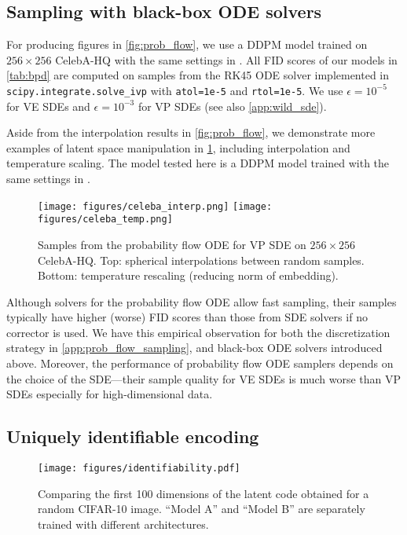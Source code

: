 \documentclass{article} \usepackage{iclr2021_conference,times}
\begin{document}
\subsection{Sampling with black-box ODE solvers}\label{app:flow}
For producing figures in \cref{fig:prob_flow}, we use a DDPM model trained on $256\times 256$ CelebA-HQ with the same settings in \citet{ho2020denoising}. All FID scores of our models in \cref{tab:bpd} are computed on samples from the RK45 ODE solver implemented in  \verb|scipy.integrate.solve_ivp| with \verb|atol=1e-5| and \verb|rtol=1e-5|. We use $\epsilon = 10^{-5}$ for VE SDEs and $\epsilon = 10^{-3}$ for VP SDEs (see also \cref{app:wild_sde}). 

Aside from the interpolation results in \cref{fig:prob_flow}, we demonstrate more examples of latent space manipulation in \cref{fig:celeba256}, including interpolation and temperature scaling. The model tested here is a DDPM model trained with the same settings in \citet{ho2020denoising}.
\begin{figure}
    \centering
    \texttt{[image: figures/celeba\_interp.png]}
    \texttt{[image: figures/celeba\_temp.png]}
    \caption{Samples from the probability flow ODE for VP SDE on $256\times 256$ CelebA-HQ. Top: spherical interpolations between random samples. Bottom: temperature rescaling (reducing norm of embedding).}
    \label{fig:celeba256}
\end{figure}

Although solvers for the probability flow ODE allow fast sampling, their samples typically have higher (worse) FID scores than those from SDE solvers if no corrector is used. We have this empirical observation for both the discretization strategy in \cref{app:prob_flow_sampling}, and black-box ODE solvers introduced above. Moreover, the performance of probability flow ODE samplers depends on the choice of the SDE---their sample quality for VE SDEs is much worse than VP SDEs especially for high-dimensional data.

\subsection{Uniquely identifiable encoding}\label{app:identifiability}

\begin{figure}
    \centering
    \texttt{[image: figures/identifiability.pdf]}
    \caption{Comparing the first 100 dimensions of the latent code obtained for a random CIFAR-10 image. ``Model A'' and ``Model B'' are separately trained with different architectures.}
    \label{fig:identifiability}
\end{figure}
\end{document}
